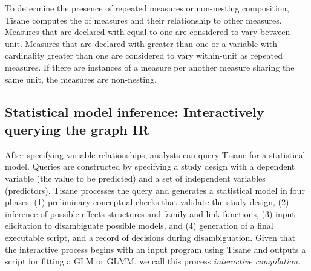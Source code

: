 To determine the presence of repeated measures or non-nesting composition,
Tisane computes the \numberofinstances of measures and their relationship to
other measures. Measures that are declared with \numberofinstances equal to one
are considered to vary between-unit. Measures that are declared with
\numberofinstances greater than one or a variable with cardinality greater than
one are considered to vary within-unit as repeated measures. If there are
instances of a measure per another measure sharing the same unit, the measures
are non-nesting.


\subsection{Statistical model inference: Interactively querying the graph IR}
\label{sec:interaction_model} After specifying variable relationships, analysts
can query Tisane for a statistical model. Queries are constructed by specifying
a study design with a dependent variable (the value to be predicted) and a set
of independent variables (predictors). Tisane processes the query and generates
a statistical model in four phases: (1) preliminary conceptual checks that
validate the study design, (2) inference of possible effects structures and
family and link functions, (3) input elicitation to disambiguate possible
models, and (4) generation of a final executable script, and a record of decisions during disambiguation. Given that the interactive process begins with
an input program using Tisane and outputs a script for fitting a GLM or GLMM, we
call this process \textit{interactive compilation}.

